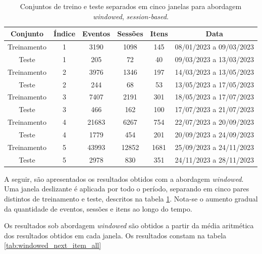 \begin{table}[htbp]
  \centering
  \begin{tabular}{|c|c|c|c|c|c|}
    \hline
    Conjunto & Índice & Eventos & Sessões & Itens & Data\\
    \hline
    Treinamento & 1 & 3190 & 1098 & 145 & 08/01/2023 a 09/03/2023\\
    \hline
    Teste & 1 & 205 & 72 & 40 & 09/03/2023 a 13/03/2023\\
    \hline
    Treinamento & 2 & 3976 & 1346 & 197 & 14/03/2023 a 13/05/2023\\
    \hline
    Teste & 2 & 244 & 68 & 53 & 13/05/2023 a 17/05/2023\\
    \hline
    Treinamento & 3 & 7407 & 2191 & 301 & 18/05/2023 a 17/07/2023\\
    \hline
    Teste & 3 & 466 & 162 & 100 & 17/07/2023 a 21/07/2023\\
    \hline
    Treinamento & 4 & 21683 & 6267 & 754 & 22/07/2023 a 20/09/2023\\
    \hline
    Teste & 4 & 1779 & 454 & 201 & 20/09/2023 a 24/09/2023\\
    \hline
    Treinamento & 5 & 43993 & 12852 & 1681 & 25/09/2023 a 24/11/2023\\
    \hline
    Teste & 5 & 2978 & 830 & 351 & 24/11/2023 a 28/11/2023\\
    \hline
  \end{tabular}
  \caption{Conjuntos de treino e teste separados em cinco janelas para abordagem \textit{windowed}, \textit{session-based}.}
  \label{tab:windowed_data}
\end{table}

A seguir, são apresentados os resultados obtidos com a abordagem
\textit{windowed}. Uma janela deslizante é aplicada por todo o período,
separando em cinco pares distintos de treinamento e teste, descritos na tabela
\ref{tab:windowed_data}. Nota-se o aumento gradual da quantidade de eventos,
sessões e itens ao longo do tempo.

Os resultados sob abordagem \textit{windowed} são obtidos a partir da média
aritmética dos resultados obtidos em cada janela. Os resultados constam na
tabela \ref{tab:windowed_next_item_all}


